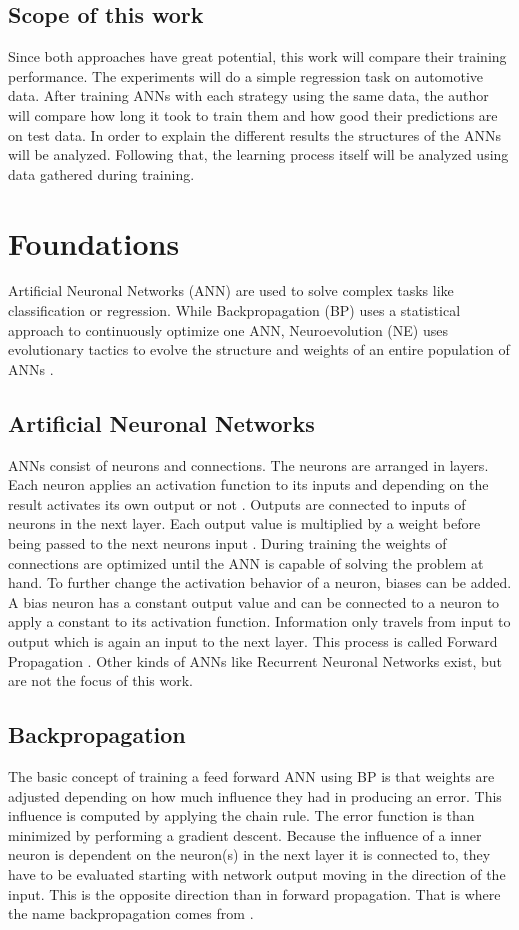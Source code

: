 \documentclass{llncs}
\begin{document}
\subsection{Scope of this work}
Since both approaches have great potential, this work will compare their training performance. The experiments will do a simple regression task on automotive data. After training ANNs with each strategy using the same data, the author will compare how long it took to train them and how good their predictions are on test data. In order to explain the different results the structures of the ANNs will be analyzed. Following that, the learning process itself will be analyzed using data gathered during training.

\section{Foundations}
%
Artificial Neuronal Networks (ANN) are used to solve complex tasks like classification or regression. While Backpropagation (BP) uses a statistical approach to continuously optimize one ANN, Neuroevolution (NE) uses evolutionary tactics to evolve the structure and weights of an entire population of ANNs \cite{Stanley.2002}. 
%
\subsection{Artificial Neuronal Networks}
%
ANNs consist of neurons and connections. The neurons are arranged in layers. Each neuron applies an activation function to its inputs and depending on the result activates its own output or not \cite{Braspenning.1995}. Outputs are connected to inputs of neurons in the next layer. Each output value is multiplied by a weight before being passed to the next neurons input \cite{Braspenning.1995}. During training the weights of connections are optimized until the ANN is capable of solving the problem at hand. To further change the activation behavior of a neuron, biases can be added. A bias neuron has a constant output value and can be connected to a neuron to apply a constant to its activation function.  Information only travels from input to output which is again an input to the next layer. This process is called Forward Propagation \cite{Braspenning.1995}. Other kinds of ANNs like Recurrent Neuronal Networks exist, but are not the focus of this work.
%
\subsection{Backpropagation}
%
The basic concept of training a feed forward ANN using BP is that weights are adjusted depending on how much influence they had in producing an error. This influence is computed by applying the chain rule. The error function is than minimized by performing a gradient descent. Because the influence of a inner neuron is dependent on the neuron(s) in the next layer it is connected to, they have to be evaluated starting with network output moving in the direction of the input. This is the opposite direction than in forward propagation. That is where the name backpropagation comes from \cite{Rojas.1996}.
%
\end{document}
